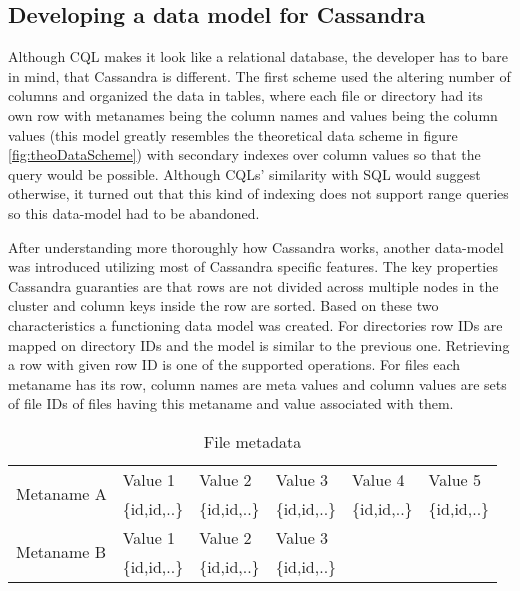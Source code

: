 \subsection{Developing a data model for Cassandra}

Although CQL makes it look like a relational database, the developer has to bare in mind, that
Cassandra is different. The first scheme used the altering number of columns and organized the 
data in tables, where each file or directory had its own row with metanames being the column
names and values being the column values (this model greatly resembles the theoretical data 
scheme in figure \ref{fig:theoDataScheme}) with secondary indexes over column values so that 
the query would be possible. Although CQLs' similarity with SQL would suggest otherwise, 
it turned out that this kind of indexing does not support range queries so this data-model
had to be abandoned. 

After understanding more thoroughly how Cassandra works, another data-model was introduced 
utilizing most of Cassandra specific features. The key properties Cassandra guaranties are that 
rows are not divided across multiple nodes in the cluster and column keys inside the row
are sorted. Based on these two characteristics a functioning data model was created. For  
directories row IDs are mapped on directory IDs and the model is similar to the previous one. 
Retrieving a row with given row ID is one of the supported operations.
For files each metaname has its row, column names are meta values and column values are sets of 
file IDs of files having this metaname and value associated with them. 

\begin{table}[h]
\centering
\begin{tabular}{|l|l|l|l|ll}
\hline
\multirow{2}{*}{Metaname A} & Value 1      & Value 2      & Value 3      & \multicolumn{1}{l|}{Value 4}      & \multicolumn{1}{l|}{Value 5}      \\ \cline{2-6}
                            & \{id,id,..\} & \{id,id,..\} & \{id,id,..\} & \multicolumn{1}{l|}{\{id,id,..\}} & \multicolumn{1}{l|}{\{id,id,..\}} \\ \hline
\multirow{2}{*}{Metaname B} & Value 1      & Value 2      & Value 3      &                                   &                                   \\ \cline{2-4}
                            & \{id,id,..\} & \{id,id,..\} & \{id,id,..\} &                                   &                                   \\ \cline{1-4}
\end{tabular}
\caption{File metadata}
\label{tab:fileMeta}
\end{table}

